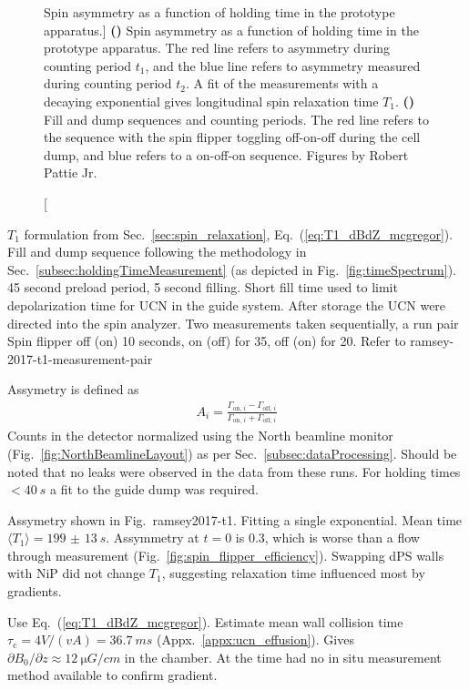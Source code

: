 \begin{figure}
\begin{subfigure}{.5\textwidth}
  \caption{}\label{subfig:ramsey2017_t1_doublet}
\end{subfigure}
\caption
    [Spin asymmetry as a function of holding time in the prototype apparatus.]
    {\textbf{()} Spin asymmetry as a function of holding time in the prototype apparatus. The red line refers to asymmetry during counting period $t_1$, and the blue line refers to asymmetry measured during counting period $t_2$. A fit of the measurements with a decaying exponential gives longitudinal spin relaxation time $T_1$. \textbf{()} Fill and dump sequences and counting periods. The red line refers to the sequence with the spin flipper toggling off-on-off during the cell dump, and blue refers to a on-off-on sequence. Figures by Robert Pattie Jr.}
\label{fig:ramsey_2017_t1}
\end{figure}

$T_1$ formulation from Sec.~\ref{sec:spin_relaxation}, Eq.~(\ref{eq:T1_dBdZ_mcgregor}). Fill and dump sequence following the methodology in Sec.~\ref{subsec:holdingTimeMeasurement} (as depicted in Fig.~\ref{fig:timeSpectrum}). 45 second preload period, 5 second filling. Short fill time used to limit depolarization time for UCN in the guide system. After storage the UCN were directed into the spin analyzer. Two measurements taken sequentially, a run pair Spin flipper off (on) 10 seconds, on (off) for 35, off (on) for 20. Refer to ramsey-2017-t1-measurement-pair

Assymetry is defined as
%
\begin{gather}
    A_i=\frac{\Gamma_{\text{on, }i}-\Gamma_{\text{off, }i}}{\Gamma_{\text{on, }i}+\Gamma_{\text{off, }i}}
    \label{eq:spin_asymmetry} 
\end{gather}
%
Counts in the detector normalized using the North beamline monitor (Fig.~\ref{fig:NorthBeamlineLayout}) as per Sec.~\ref{subsec:dataProcessing}. Should be noted that no leaks were observed in the data from these runs.  For holding times $<\qty{40}{s}$ a fit to the guide dump was required.

Assymetry shown in Fig.~ramsey2017-t1. Fitting a single exponential. Mean time $\langle T_1 \rangle=\qty{199(13)}{s}$. Assymmetry at $t=0$ is 0.3, which is worse than a flow through measurement (Fig.~\ref{fig:spin_flipper_efficiency}). Swapping dPS walls with NiP did not change $T_1$, suggesting relaxation time influenced most by gradients.

Use Eq.~(\ref{eq:T1_dBdZ_mcgregor}). Estimate mean wall collision time $\tau_\text{c}=4V/(vA)=\qty{36.7}{ms}$ (Appx.~\ref{appx:ucn_effusion}). Gives $\partial B_0/\partial z\approx \qty{12}{\micro G\per cm}$ in the chamber. At the time had no in situ measurement method available to confirm gradient.

